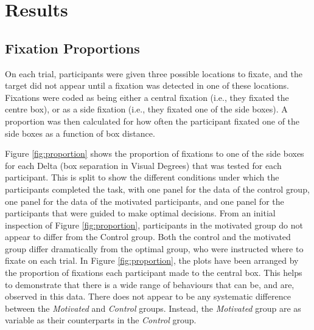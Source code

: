 \documentclass[vision,article,submit,moreauthors,pdftex,10pt,a4paper]{mdpi}
\begin{document}
\section{Results}
\subsection{Fixation Proportions}
On each trial, participants were given three possible locations to fixate, and the target did not appear until a fixation was detected in one of these locations. Fixations were coded as being either a central fixation (i.e., they fixated the centre box), or as a side fixation (i.e., they fixated one of the side boxes). A proportion was then calculated for how often the participant fixated one of the side boxes as a function of box distance.

Figure \ref{fig:proportion} shows the proportion of fixations to one of the side boxes for each Delta (box separation in Visual Degrees) that was tested for each participant. This is split to show the different conditions under which the participants completed the task, with one panel for the data of the control group, one panel for the data of the motivated participants, and one panel for the participants that were guided to make optimal decisions. From an initial inspection of Figure \ref{fig:proportion}, participants in the motivated group do not appear to differ from the Control group. Both the control and the motivated group differ dramatically from the optimal group, who were instructed where to fixate on each trial. In Figure \ref{fig:proportion}, the plots have been arranged by the proportion of fixations each participant made to the central box. This helps to demonstrate that there is a wide range of behaviours that can be, and are, observed in this data. There does not appear to be any systematic difference between the \textit{Motivated} and \textit{Control} groups. Instead, the \textit{Motivated} group are as variable as their counterparts in the \textit{Control} group.
\end{document}
